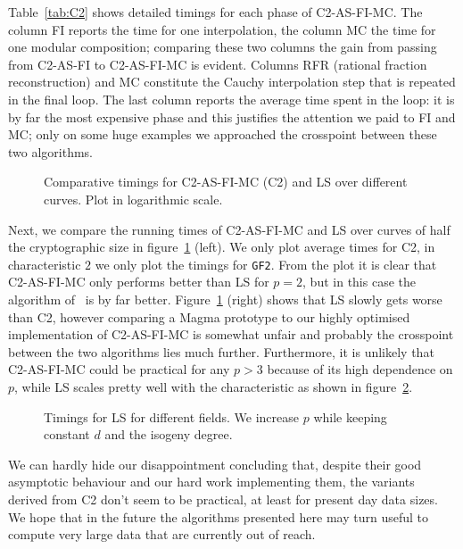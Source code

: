 Table~\ref{tab:C2} shows detailed timings for each phase of
C2-AS-FI-MC. The column FI reports the time for one interpolation, the
column MC the time for one modular composition; comparing these two
columns the gain from passing from C2-AS-FI to C2-AS-FI-MC is
evident. Columns RFR (rational fraction reconstruction) and MC
constitute the Cauchy interpolation step that is repeated in the final
loop. The last column reports the average time spent in the loop: it
is by far the most expensive phase and this justifies the attention we
paid to FI and MC; only on some huge examples we approached the
crosspoint between these two algorithms.

\begin{figure}
  \centering
   \caption{Comparative timings for C2-AS-FI-MC (C2) and LS over
     different curves. Plot in logarithmic scale.}
  \label{fig:comp}
\end{figure}

Next, we compare the running times of C2-AS-FI-MC and LS over curves
of half the cryptographic size in figure~\ref{fig:comp} (left). We
only plot average times for C2, in characteristic $2$ we only plot the
timings for \texttt{GF2}. From the plot it is clear that C2-AS-FI-MC
only performs better than LS for $p=2$, but in this case the algorithm
of~\cite{Ler96} is by far better.  Figure~\ref{fig:comp} (right) shows
that LS slowly gets worse than C2, however comparing a Magma prototype
to our highly optimised implementation of C2-AS-FI-MC is somewhat
unfair and probably the crosspoint between the two algorithms lies
much further. Furthermore, it is unlikely that C2-AS-FI-MC could be
practical for any $p>3$ because of its high dependence on $p$, while
LS scales pretty well with the characteristic as shown in
figure~\ref{fig:LSp}.

\begin{figure}
  \centering
  \caption{Timings for LS for different fields. We increase $p$ while
    keeping constant $d$ and the isogeny degree.}
  \label{fig:LSp}
\end{figure}

We can hardly hide our disappointment concluding that, despite their
good asymptotic behaviour and our hard work implementing them, the
variants derived from C2 don't seem to be practical, at least for
present day data sizes. We hope that in the future the algorithms
presented here may turn useful to compute very large data that are
currently out of reach.




%
